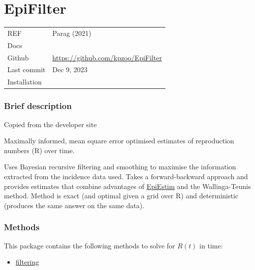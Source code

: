 \documentclass[
  letterpaper,
  DIV=11,
  numbers=noendperiod]{scrreprt}
\providecommand{\tightlist}{%
  \setlength{\itemsep}{0pt}\setlength{\parskip}{0pt}}\usepackage{longtable,booktabs,array}
\begin{document}
\chapter*{EpiFilter}\label{epifilter}


\begin{longtable}[]{@{}
  >{\raggedright\arraybackslash}p{}
  >{\raggedright\arraybackslash}p{}@{}}
\toprule\noalign{}
\endhead
\bottomrule\noalign{}
\endlastfoot
REF & Parag (2021) \\
Docs & \\
Github & \url{https://github.com/kpzoo/EpiFilter} \\
Last commit & Dec 9, 2023 \\
Installation & \\
\end{longtable}

\subsection*{Brief description}\label{brief-description-4}

Copied from the developer site

Maximally informed, mean square error optimised estimates of
reproduction numbers (R) over time.

Uses Bayesian recursive filtering and smoothing to maximise the
information extracted from the incidence data used. Takes a
forward-backward approach and provides estimates that combine advantages
of \href{package_EpiEstim.qmd}{EpiEstim} and the Wallinga-Teunis method.
Method is exact (and optimal given a grid over R) and deterministic
(produces the same answer on the same data).

\subsection*{Methods}\label{methods-3}

This package contains the following methods to solve for \(R(t)\) in
time:

\begin{itemize}
\tightlist
\item
  \hyperref[sec-filtering]{filtering}
\end{itemize}
\end{document}
